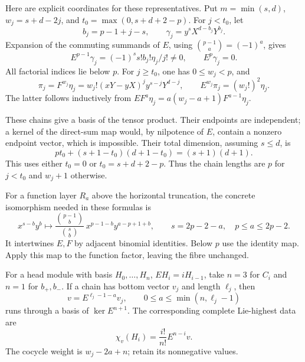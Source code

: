 \documentclass[11pt]{article}
\theoremstyle{plain}
\theoremstyle{definition}
\theoremstyle{remark}
\numberwithin{equation}{section}
\begin{document}
Here are explicit coordinates for these representatives.
Put \(m=\min(s,d)\), \(w_j=s+d-2j\), and
\(t_0=\max(0,s+d+2-p)\).
For \(j<t_0\), let
\[
 b_j=p-1+j-s,\qquad
 \gamma_j=y^sX^{d-b_j}Y^{b_j}.
\]
Expansion of the commuting summands of \(E\), using
\(\binom{p-1}{a}=(-1)^a\), gives
\begin{equation}\label{eq:long-endpoint-chain}
 E^{p-1}\gamma_j
       =(-1)^s s!b_j!\eta_j/j!\ne0,\qquad E^p\gamma_j=0.
\end{equation}
All factorial indices lie below \(p\).
For \(j\ge t_0\), one has \(0\le w_j<p\), and
\begin{equation}\label{eq:short-endpoint-chain}
 \pi_j=F^{w_j}\eta_j
      =w_j!(xY-yX)^j y^{s-j}Y^{d-j},\qquad
 E^{w_j}\pi_j=(w_j!)^2\eta_j .
\end{equation}
The latter follows inductively from
\(EF^a\eta_j=a(w_j-a+1)F^{a-1}\eta_j\).

These chains give a basis of the tensor product.
Their endpoints are independent; a kernel of the direct-sum map
would, by nilpotence of \(E\), contain a nonzero endpoint vector,
which is impossible.
Their total dimension, assuming \(s\le d\), is
\[
 pt_0+(s+1-t_0)(d+1-t_0)=(s+1)(d+1).
\]
This uses either \(t_0=0\) or \(t_0=s+d+2-p\).
Thus the chain lengths are \(p\) for \(j<t_0\) and \(w_j+1\)
otherwise.

For a function layer \(R_a\) above the horizontal truncation,
the concrete isomorphism needed in these formulas is
\begin{equation}\label{eq:truncated-horizontal-identification}
 x^{s-b}y^b\longmapsto
 \frac{\binom{p-1}{b}}{\binom{s}{b}}\,
           x^{p-1-b}y^{a-p+1+b},
 \qquad s=2p-2-a,\quad p\le a\le2p-2 .
\end{equation}
It intertwines \(E,F\) by adjacent binomial identities.
Below \(p\) use the identity map.
Apply this map to the function factor, leaving the fibre unchanged.

For a head module with basis \(H_0,\ldots,H_n\),
\(EH_i=iH_{i-1}\), take \(n=3\) for \(C_i\) and \(n=1\)
for \(b_+,b_-\). If a chain has bottom vector \(v_j\)
and length \(\ell_j\), then
\[
 v=E^{\ell_j-1-a}v_j,\qquad
 0\le a\le\min(n,\ell_j-1)
\]
runs through a basis of \(\ker E^{n+1}\).
The corresponding complete Lie-highest data are
\begin{equation}\label{eq:highest-endpoint-recovery}
 \chi_v(H_i)=\frac{i!}{n!}E^{n-i}v .
\end{equation}
The cocycle weight is \(w_j-2a+n\); retain its nonnegative values.
\end{document}
